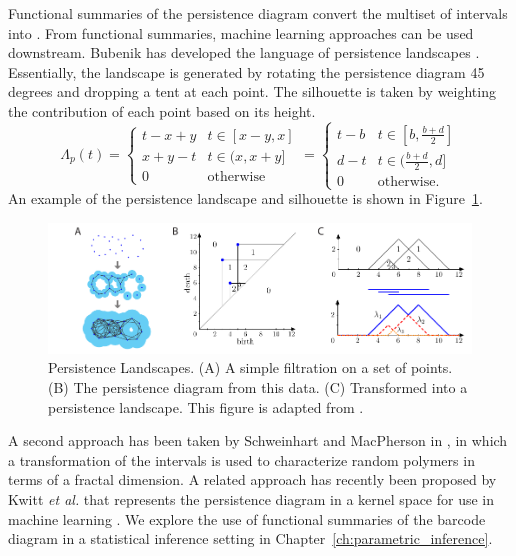Functional summaries of the persistence diagram convert the multiset of intervals into .
From functional summaries, machine learning approaches can be used downstream.
Bubenik has developed the language of persistence landscapes \cite{Bubenik:2007ux,Bubenik2015:um}.
Essentially, the landscape is generated by rotating the persistence diagram 45 degrees and dropping a tent at each point.
The silhouette is taken by weighting the contribution of each point based on its height.
\begin{equation}
 \Lambda_{p}(t) =
 \begin{cases}
  t-x+y & t \in [x-y, x] \\
  x+y-t & t \in (x,  x+y] \\
  0 & \text{otherwise}
 \end{cases}
 =
 \begin{cases}
  t-b & t \in [b, \frac{b+d}{2}] \\
  d-t & t \in (\frac{b+d}{2}, d] \\
  0 & \text{otherwise}.
 \end{cases}
\end{equation}
An example of the persistence landscape and silhouette is shown in Figure~\ref{fig:bg:persistence_landscape}.

\begin{figure}
	\centering
	\includegraphics[]{fig/background/persistence_landscape.pdf}
	\caption[Persistence landscape of the persistence diagram]{Persistence Landscapes. (A) A simple filtration on a set of points. (B) The persistence diagram from this data. (C) Transformed into a persistence landscape. This figure is adapted from \cite[Fig.~2]{Bubenik2015:um}.}
	\label{fig:bg:persistence_landscape}
\end{figure}

A second approach has been taken by Schweinhart and MacPherson in \cite{MacPherson:2012eq}, in which a transformation of the intervals is used to characterize random polymers in terms of a fractal dimension.
A related approach has recently been proposed by Kwitt \emph{et al.} that represents the persistence diagram in a kernel space for use in machine learning \cite{Kwitt:2015,Reininghaus:2015a}.
We explore the use of functional summaries of the barcode diagram in a statistical inference setting in Chapter~\ref{ch:parametric_inference}.

